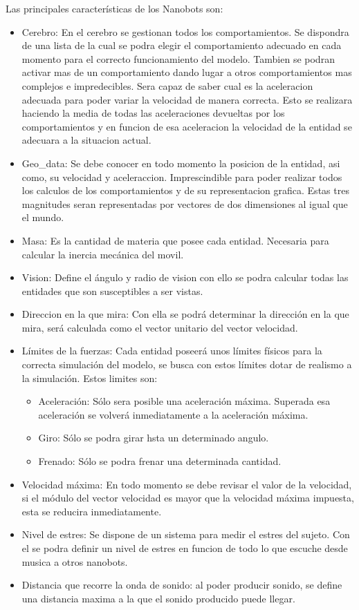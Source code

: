 \noindent Las principales características de los Nanobots son:  
\begin{itemize}
 \item  Cerebro: En el cerebro se gestionan todos los comportamientos. Se dispondra de una lista de la cual se podra elegir el comportamiento adecuado en cada momento para el correcto funcionamiento del modelo. Tambien se podran activar mas de un comportamiento dando lugar a otros comportamientos mas complejos e impredecibles. Sera capaz de saber cual es la aceleracion adecuada para poder variar la velocidad de manera correcta. Esto se realizara haciendo la media de todas las aceleraciones devueltas por los comportamientos y en funcion de esa aceleracion la velocidad de la entidad se adecuara a la situacion actual.
 \item Geo\_data: Se debe conocer en todo momento la posicion de la entidad, asi como, su velocidad y aceleraccion. Imprescindible para poder realizar todos los calculos de los comportamientos y de su representacion grafica. Estas tres magnitudes seran representadas por vectores de dos dimensiones al igual que el mundo.
 \item Masa: Es la cantidad de materia que posee cada entidad. Necesaria para calcular la inercia mecánica del movil. 
 \item  Vision: Define el ángulo y radio de vision con ello se podra calcular todas las entidades que son susceptibles a ser vistas.
 \item Direccion en la que mira: Con ella se podrá determinar la dirección en la que mira, será calculada como el vector unitario del vector velocidad.
 \item Límites de la fuerzas: Cada entidad poseerá unos límites físicos para la correcta simulación del modelo, se busca con estos límites dotar de realismo a la simulación. Estos limites son:
 \begin{itemize}
   \item Aceleración: Sólo sera posible una aceleración máxima. Superada esa aceleración se volverá inmediatamente a la aceleración máxima.
   \item Giro: Sólo se podra girar hsta un determinado angulo.
   \item Frenado: Sólo se podra frenar una determinada cantidad. 
 \end{itemize}	
 \item Velocidad máxima: En todo momento se debe revisar el valor de la velocidad, si el módulo del vector velocidad es mayor que la velocidad máxima impuesta, esta se reducira inmediatamente.
 \item Nivel de estres: Se dispone de un sistema para medir el estres del sujeto. Con el se podra definir un nivel de estres en funcion de todo lo que escuche desde musica a otros nanobots.
 \item Distancia que recorre la onda de sonido: al poder producir sonido, se define una distancia maxima a la que el sonido producido puede llegar.
\end{itemize}


